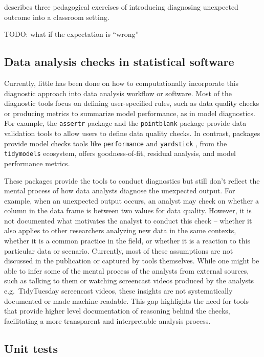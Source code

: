 \documentclass[
]{jds}
\begin{document}
\citep{peng_diagnosing_2021} describes three pedagogical exercises of
introducing diagnosing unexpected outcome into a classroom setting.

TODO: what if the expectation is ``wrong''

\subsection{Data analysis checks in statistical
software}\label{data-analysis-checks-in-statistical-software}

Currently, little has been done on how to computationally incorporate
this diagnostic approach into data analysis workflow or software. Most
of the diagnostic tools focus on defining user-specified rules, such as
data quality checks or producing metrics to summarize model performance,
as in model diagnostics. For example, the \texttt{assertr} package
\citep{assertr} and the \texttt{pointblank} package \citep{pointblank}
provide data validation tools to allow users to define data quality
checks. In contrast, packages provide model checks tools like
\texttt{performance} \citep{performance} and \texttt{yardstick}
\citep{yardstick}, from the \texttt{tidymodels} \citep{tidymodels}
ecosystem, offers goodness-of-fit, residual analysis, and model
performance metrics.

These packages provide the tools to conduct diagnostics but still don't
reflect the mental process of how data analysts diagnose the unexpected
output. For example, when an unexpected output occurs, an analyst may
check on whether a column in the data frame is between two values for
data quality. However, it is not documented what motivates the analyst
to conduct this check -- whether it also applies to other researchers
analyzing new data in the same contexts, whether it is a common practice
in the field, or whether it is a reaction to this particular data or
scenario. Currently, most of these assumptions are not discussed in the
publication or captured by tools themselves. While one might be able to
infer some of the mental process of the analysts from external sources,
such as talking to them or watching screencast videos produced by the
analysts e.g.~TidyTuesday screencast videos, these insights are not
systematically documented or made machine-readable. This gap highlights
the need for tools that provide higher level documentation of reasoning
behind the checks, facilitating a more transparent and interpretable
analysis process.

\subsection{Unit tests}\label{unit-tests}
\end{document}
